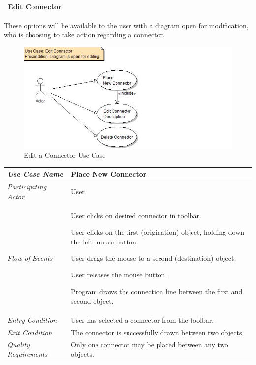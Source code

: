 \documentclass[twoside,letterpaper]{article}
\newenvironment{my_enumerate}{
\begin{enumerate}
  \setlength{\itemsep}{1pt}
  \setlength{\parskip}{0pt}
  \setlength{\parsep}{0pt}}{\end{enumerate}
}
\begin{document}
\clearpage

\paragraph[\ Use Category]
{\ Edit Connector} {These options will be available to the user with a diagram open for modification, who is choosing to take action regarding a connector.}

\begin{figure}[h]
\centering
\includegraphics[width=6.0in]{ucaseEditConn.jpg}
\caption{Edit a Connector Use Case}
\end{figure}

\begin{flushleft}
\tablehead{}
\begin{tabular}{|m{2.0in} m{5.0in}|}
\hline 
  {\bfseries\emph{Use Case Name}} 
  & {\bfseries Place New Connector}
\\\hline
  \emph{Participating Actor} 
  & User
\\\hline
\emph{Flow of Events}
& \begin{my_enumerate}
\item User clicks on desired connector in toolbar.
\item User clicks on the first (origination) object, holding down the left mouse button.
\item User drags the mouse to a second (destination) object.
\item User releases the mouse button.
\item Program draws the connection line between the first and second object.
\end{my_enumerate}
\\\hline
  \emph{Entry Condition}
  & User has selected a connector from the toolbar.
\\\hline
  \emph{Exit Condition}
  & The connector is successfully drawn between two objects. 
\\\hline
  \emph{Quality Requirements}
  & Only one connector may be placed between any two objects.
\\\hline
\end{tabular}
\end{flushleft}
\bigskip
\end{document}
